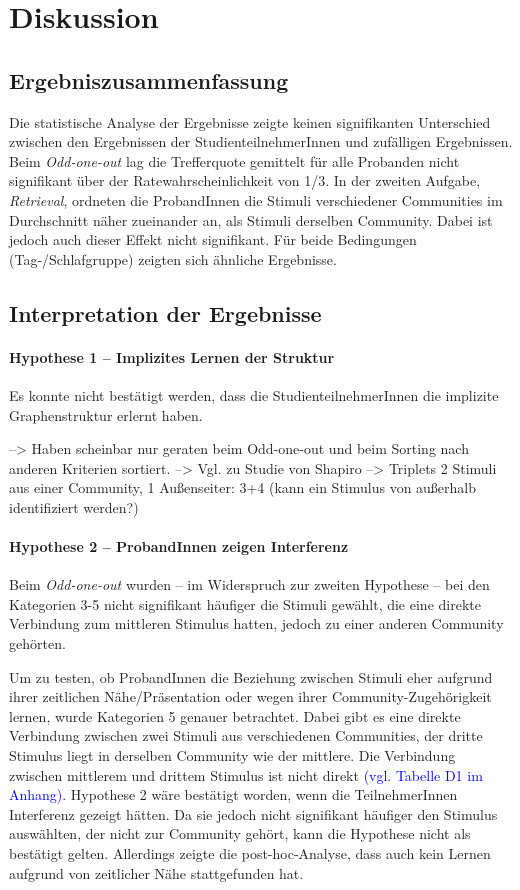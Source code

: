\section{Diskussion}
\label{S:4}
\subsection{Ergebniszusammenfassung}
Die statistische Analyse der Ergebnisse zeigte keinen signifikanten Unterschied zwischen den Ergebnissen der StudienteilnehmerInnen und zufälligen Ergebnissen. Beim \textit{Odd-one-out} lag die Trefferquote gemittelt für alle Probanden nicht signifikant über der Ratewahrscheinlichkeit von 1/3. In der zweiten Aufgabe, \textit{Retrieval}, ordneten die ProbandInnen die Stimuli verschiedener Communities im Durchschnitt näher zueinander an, als Stimuli derselben Community. Dabei ist jedoch auch dieser Effekt nicht signifikant. Für beide Bedingungen (Tag-/Schlafgruppe) zeigten sich ähnliche Ergebnisse.

\subsection{Interpretation der Ergebnisse}
\paragraph{Hypothese 1 – Implizites Lernen der Struktur}
Es konnte nicht bestätigt werden, dass die StudienteilnehmerInnen die implizite Graphenstruktur erlernt haben.

--> Haben scheinbar nur geraten beim Odd-one-out und beim Sorting nach anderen Kriterien sortiert.
--> Vgl. zu Studie von Shapiro
--> Triplets 2 Stimuli aus einer Community, 1 Außenseiter: 3+4 (kann ein Stimulus von außerhalb identifiziert werden?)

\paragraph{Hypothese 2 – ProbandInnen zeigen Interferenz}
Beim \textit{Odd-one-out} wurden – im Widerspruch zur zweiten Hypothese – bei den Kategorien 3-5 nicht signifikant häufiger die Stimuli gewählt, die eine direkte Verbindung zum mittleren Stimulus hatten, jedoch zu einer anderen Community gehörten.

Um zu testen, ob ProbandInnen die Beziehung zwischen Stimuli eher aufgrund ihrer zeitlichen Nähe/Präsentation oder wegen ihrer Community-Zugehörigkeit lernen, wurde Kategorien 5 genauer betrachtet. Dabei gibt es eine direkte Verbindung zwischen zwei Stimuli aus verschiedenen Communities, der dritte Stimulus liegt in derselben Community wie der mittlere. Die Verbindung zwischen mittlerem und drittem Stimulus ist nicht direkt \textcolor{blue}{(vgl. Tabelle D1 im Anhang)}. Hypothese 2 wäre bestätigt worden, wenn die TeilnehmerInnen Interferenz gezeigt hätten. Da sie jedoch nicht signifikant häufiger den Stimulus auswählten, der nicht zur Community gehört, kann die Hypothese nicht als bestätigt gelten. Allerdings zeigte die post-hoc-Analyse, dass auch kein Lernen aufgrund von zeitlicher Nähe stattgefunden hat.

